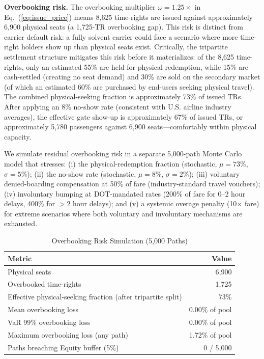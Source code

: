 \documentclass[12pt,a4paper]{article}
\begin{document}
\textbf{Overbooking risk.} The overbooking multiplier $\omega = 1.25\times$ in Eq.~(\ref{eq:issue_price}) means 8,625 time-rights are issued against approximately 6,900 physical seats (a 1,725-TR overbooking gap). This risk is distinct from carrier default risk: a fully solvent carrier could face a scenario where more time-right holders show up than physical seats exist. Critically, the tripartite settlement structure mitigates this risk before it materializes: of the 8,625 time-rights, only an estimated 55\% are held for physical redemption, while 15\% are cash-settled (creating no seat demand) and 30\% are sold on the secondary market (of which an estimated 60\% are purchased by end-users seeking physical travel). The combined physical-seeking fraction is approximately 73\% of issued TRs. After applying an 8\% no-show rate (consistent with U.S. airline industry averages), the effective gate show-up is approximately 67\% of issued TRs, or approximately 5,780 passengers against 6,900 seats---comfortably within physical capacity.

We simulate residual overbooking risk in a separate 5,000-path Monte Carlo model that stresses: (i) the physical-redemption fraction (stochastic, $\mu = 73\%$, $\sigma = 5\%$); (ii) the no-show rate (stochastic, $\mu = 8\%$, $\sigma = 2\%$); (iii) voluntary denied-boarding compensation at 50\% of fare (industry-standard travel vouchers); (iv) involuntary bumping at DOT-mandated rates (200\% of fare for 0--2 hour delays, 400\% for $>$2 hour delays); and (v) a systemic overage penalty (10$\times$ fare) for extreme scenarios where both voluntary and involuntary mechanisms are exhausted.

\begin{table}[H]
\centering
\caption{Overbooking Risk Simulation (5,000 Paths)}
\label{tab:overbooking_sim}
\begin{tabular}{lr}
\toprule
\textbf{Metric} & \textbf{Value} \\
\midrule
Physical seats & 6,900 \\
Overbooked time-rights & 1,725 \\
Effective physical-seeking fraction (after tripartite split) & 73\% \\
Mean overbooking loss & 0.00\% of pool \\
VaR 99\% overbooking loss & 0.00\% of pool \\
Maximum overbooking loss (any path) & 1.72\% of pool \\
Paths breaching Equity buffer (5\%) & 0 / 5,000 \\
\bottomrule
\end{tabular}
\end{table}
\end{document}
